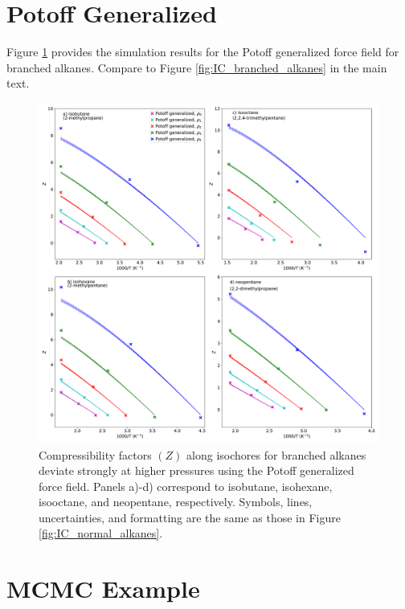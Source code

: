 \documentclass[journal=jctc,manuscript=article]{achemso}
\begin{document}
\section{Potoff Generalized} \label{Potoff Generalized}

Figure \ref{fig:IC_branched_alkanes_supporting_information} provides the simulation results for the Potoff generalized force field for branched alkanes. Compare to Figure \ref{fig:IC_branched_alkanes} in the main text.

\begin{figure}[H]
	\centering
	\includegraphics[width=6.2in]{IC_branched_alkanes_supporting_information}
	\caption{Compressibility factors $(Z)$ along isochores for branched alkanes deviate strongly at higher pressures using the Potoff generalized force field. Panels a)-d) correspond to isobutane, isohexane, isooctane, and neopentane, respectively. Symbols, lines, uncertainties, and formatting are the same as those in Figure \ref{fig:IC_normal_alkanes}.}
	\label{fig:IC_branched_alkanes_supporting_information}
\end{figure}

\newpage

\section{MCMC Example} \label{MCMC Example}
\end{document}
